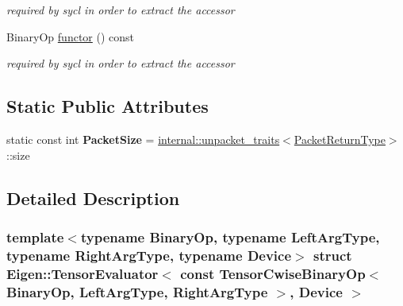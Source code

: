 \begin{DoxyCompactItemize}
\begin{DoxyCompactList}\small\item\em required by sycl in order to extract the accessor \end{DoxyCompactList}\item 
\mbox{\label{struct_eigen_1_1_tensor_evaluator_3_01const_01_tensor_cwise_binary_op_3_01_binary_op_00_01_left_d0674d2fbf9b5f3fd40347d3eda7a38d_a2918eff26a6ece37e4a53bc8d3fdbb55}} 
Binary\+Op \hyperlink{struct_eigen_1_1_tensor_evaluator_3_01const_01_tensor_cwise_binary_op_3_01_binary_op_00_01_left_d0674d2fbf9b5f3fd40347d3eda7a38d_a2918eff26a6ece37e4a53bc8d3fdbb55}{functor} () const
\begin{DoxyCompactList}\small\item\em required by sycl in order to extract the accessor \end{DoxyCompactList}\end{DoxyCompactItemize}
\subsection*{Static Public Attributes}
\begin{DoxyCompactItemize}
\item 
\mbox{\label{struct_eigen_1_1_tensor_evaluator_3_01const_01_tensor_cwise_binary_op_3_01_binary_op_00_01_left_d0674d2fbf9b5f3fd40347d3eda7a38d_a3fa60311eee48a94fa805bf10b26cfc6}} 
static const int {\bfseries Packet\+Size} = \hyperlink{struct_eigen_1_1internal_1_1unpacket__traits}{internal\+::unpacket\+\_\+traits}$<$\hyperlink{group___sparse_core___module}{Packet\+Return\+Type}$>$\+::size
\end{DoxyCompactItemize}


\subsection{Detailed Description}
\subsubsection*{template$<$typename Binary\+Op, typename Left\+Arg\+Type, typename Right\+Arg\+Type, typename Device$>$\newline
struct Eigen\+::\+Tensor\+Evaluator$<$ const Tensor\+Cwise\+Binary\+Op$<$ Binary\+Op, Left\+Arg\+Type, Right\+Arg\+Type $>$, Device $>$}



